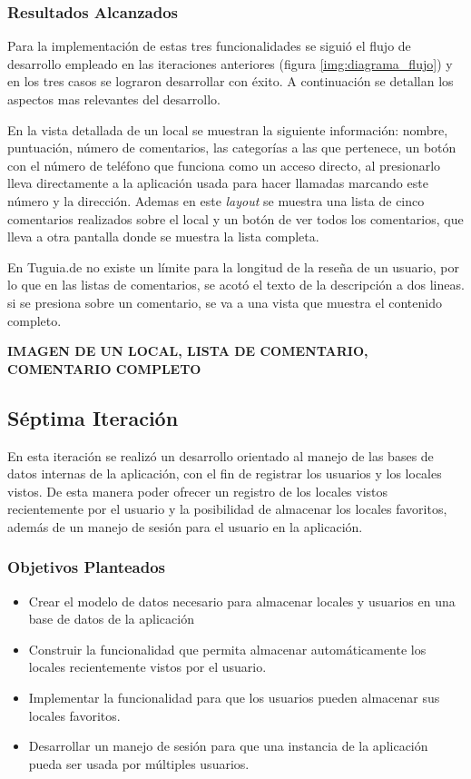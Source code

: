 \subsubsection{Resultados Alcanzados}

Para la implementación de estas tres funcionalidades se siguió el flujo de desarrollo empleado en las iteraciones anteriores (figura \ref{img:diagrama_flujo}) y en los tres casos se lograron desarrollar con éxito. A continuación se detallan los aspectos mas relevantes del desarrollo.

En la vista detallada de un local se muestran la siguiente información: nombre, puntuación, número de comentarios, las categorías a las que pertenece, un botón con el número de teléfono que funciona como un acceso directo, al presionarlo lleva directamente a la aplicación usada para hacer llamadas marcando este número y la dirección. Ademas en este \textit{layout} se muestra una lista de cinco comentarios realizados sobre el local y un botón de ver todos los comentarios, que lleva a otra pantalla donde se muestra la lista completa.

En Tuguia.de no existe un límite para la longitud de la reseña de un usuario, por lo que en las listas de comentarios, se acotó el texto de la descripción a dos lineas. si se presiona sobre un comentario, se va a una vista que muestra el contenido completo.

\textbf{IMAGEN DE UN LOCAL, LISTA DE COMENTARIO, COMENTARIO COMPLETO}
\subsection{Séptima Iteración}

En esta iteración se realizó un desarrollo orientado al manejo de las bases de datos internas de la aplicación, con el fin de registrar los usuarios y los locales vistos. De esta manera poder ofrecer un registro de los locales vistos recientemente por el usuario y la posibilidad de almacenar los locales favoritos, además de un manejo de sesión para el usuario en la aplicación.

\subsubsection{Objetivos Planteados} 

\begin{itemize}
\item Crear el modelo de datos necesario para almacenar locales y usuarios en una base de datos de la aplicación
\item Construir la funcionalidad que permita almacenar automáticamente los locales recientemente vistos por el usuario.
\item Implementar la funcionalidad para que los usuarios pueden almacenar sus locales favoritos.
\item Desarrollar un manejo de sesión para que una instancia de la aplicación pueda ser usada por múltiples usuarios. 
\end{itemize}

